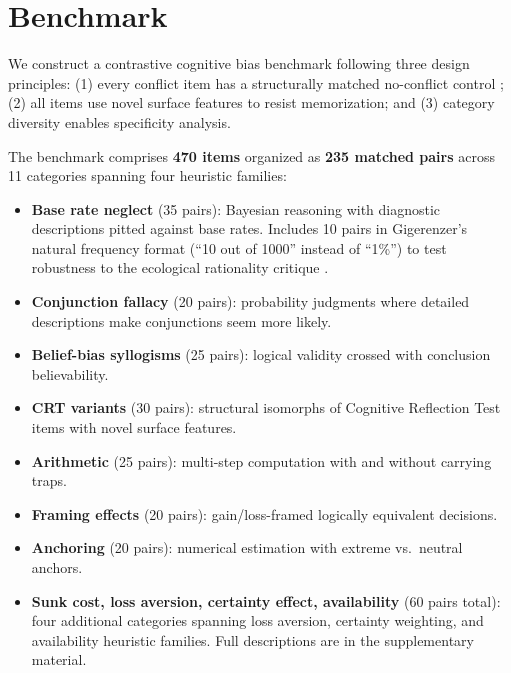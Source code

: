 \documentclass[accepted]{article}
\begin{document}

\section{Benchmark}
\label{sec:benchmark}

We construct a contrastive cognitive bias benchmark following three
design principles: (1) every conflict item has a structurally matched
no-conflict control \citep{deneys2012bias}; (2) all items use novel
surface features to resist memorization; and (3) category diversity
enables specificity analysis.

The benchmark comprises \textbf{470 items} organized as \textbf{235
matched pairs} across 11 categories spanning four heuristic families:

\begin{itemize}[leftmargin=*,itemsep=1pt]
  \item \textbf{Base rate neglect} (35 pairs): Bayesian reasoning with
  diagnostic descriptions pitted against base rates.  Includes 10 pairs
  in Gigerenzer's natural frequency format (``10 out of 1000'' instead
  of ``1\%'') to test robustness to the ecological rationality critique
  \citep{gigerenzer1995improve}.
  \item \textbf{Conjunction fallacy} (20 pairs): probability judgments
  where detailed descriptions make conjunctions seem more likely.
  \item \textbf{Belief-bias syllogisms} (25 pairs): logical validity
  crossed with conclusion believability.
  \item \textbf{CRT variants} (30 pairs): structural isomorphs of
  Cognitive Reflection Test items with novel surface features.
  \item \textbf{Arithmetic} (25 pairs): multi-step computation with
  and without carrying traps.
  \item \textbf{Framing effects} (20 pairs): gain/loss-framed logically
  equivalent decisions.
  \item \textbf{Anchoring} (20 pairs): numerical estimation with
  extreme vs.\ neutral anchors.
  \item \textbf{Sunk cost, loss aversion, certainty effect, availability}
  (60 pairs total): four additional categories spanning loss aversion,
  certainty weighting, and availability heuristic families.  Full
  descriptions are in the supplementary material.
\end{itemize}
\end{document}
